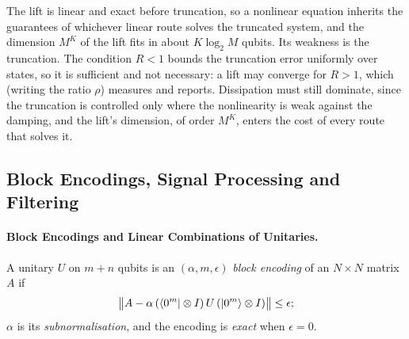 The lift is linear and exact before truncation, so a nonlinear equation inherits the guarantees of whichever linear route solves the truncated system, and the dimension $M^K$ of the lift fits in about $K\log_2M$ qubits. Its weakness is the truncation. The condition $R<1$ bounds the truncation error uniformly over states, so it is sufficient and not necessary: a lift may converge for $R>1$, which  (writing the ratio $\rho$) measures and  reports. Dissipation must still dominate, since the truncation is controlled only where the nonlinearity is weak against the damping, and the lift's dimension, of order $M^K$, enters the cost of every route that solves it.

\subsection{Block Encodings, Signal Processing and Filtering}
\label{sec:bg-primitives}

\paragraph{Block Encodings and Linear Combinations of Unitaries.}
\label{sec:bg-block-encoding}

\begin{definition}
\label{def:block-encoding}
A unitary $U$ on $m+n$ qubits is an $(\alpha,m,\epsilon)$ \emph{block encoding} of an $N\times N$ matrix $A$ if
\begin{equation}
    \bigl\|A-\alpha\,(\bra{0^m}\otimes I)\,U\,(\ket{0^m}\otimes I)\bigr\|\le\epsilon ;
    \label{eq:block-encoding}
\end{equation}
$\alpha$ is its \emph{subnormalisation}, and the encoding is \emph{exact} when $\epsilon=0$.
\end{definition}


